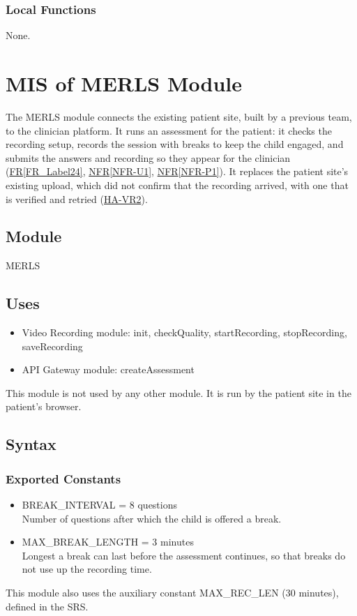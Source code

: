 \documentclass[12pt, titlepage]{article}
\newcommand{\srsref}[2]{\href{https://github.com/Nour-Fawaz/MacaBoca/blob/main/pdfs/SRS/SRS.pdf}{#1\ref*{#2}}}
\newcommand{\hazref}[1]{\href{https://github.com/Nour-Fawaz/MacaBoca/blob/main/pdfs/HazardAnalysis/HazardAnalysis.pdf}{#1}}
\begin{document}
\subsubsection{Local Functions}
None.

\newpage
\section{MIS of MERLS Module} \label{MERLS}
The MERLS module connects the existing patient site, built by a previous team, to the clinician platform. It runs an assessment for the patient: it checks the recording setup, records the session with breaks to keep the child engaged, and submits the answers and recording so they appear for the clinician (\srsref{FR}{FR_Label24}, \srsref{NFR}{NFR-U1}, \srsref{NFR}{NFR-P1}). It replaces the patient site's existing upload, which did not confirm that the recording arrived, with one that is verified and retried (\hazref{HA-VR2}).

\subsection{Module}
MERLS

\subsection{Uses}
\begin{itemize}
\item Video Recording module: init, checkQuality, startRecording, stopRecording, saveRecording
\item API Gateway module: createAssessment
\end{itemize}
This module is not used by any other module. It is run by the patient site in the patient's browser.

\subsection{Syntax}

\subsubsection{Exported Constants}
\begin{itemize}
\item BREAK\_INTERVAL = 8 questions\\
Number of questions after which the child is offered a break.
\item MAX\_BREAK\_LENGTH = 3 minutes\\
Longest a break can last before the assessment continues, so that breaks do not use up the recording time.
\end{itemize}
This module also uses the auxiliary constant MAX\_REC\_LEN (30 minutes), defined in the SRS.
\end{document}
